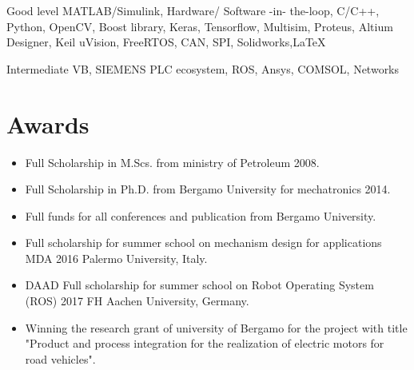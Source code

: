 \documentclass[fontsize=12pt]{tccv}
\begin{document}
	\begin{factlist}
		
		\item{Good level}
		{MATLAB/Simulink, Hardware/ Software -in- the-loop, C/C++, Python, OpenCV, Boost library, Keras, Tensorflow, Multisim, Proteus, Altium Designer, Keil uVision, FreeRTOS, CAN, SPI, Solidworks,\LaTeX}
		
		\item{Intermediate}
		{VB, SIEMENS PLC ecosystem, ROS, Ansys, COMSOL, Networks}
		
	\end{factlist}
	\vspace{-3mm}
	\section{Awards}
\begin{itemize}
	\item Full Scholarship in M.Scs. from ministry of Petroleum 2008.
	\item Full Scholarship in Ph.D. from Bergamo University for mechatronics 2014.
	\item Full funds for all conferences and publication from Bergamo University.
	\item Full scholarship for summer school on mechanism design for applications MDA 2016 Palermo University, Italy.
	\item DAAD Full scholarship for summer school on Robot Operating System (ROS) 2017 FH Aachen University, Germany.
	\item Winning the research grant of university of Bergamo for the project with title "Product and process integration for the realization of electric motors for road vehicles".
\end{itemize}
\vspace{-10mm}
\end{document}
